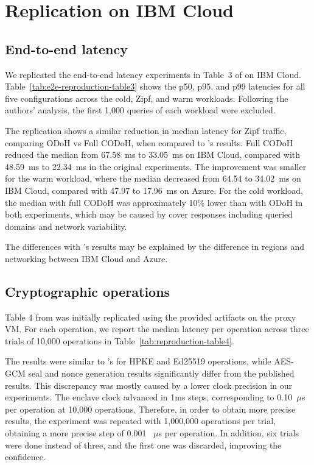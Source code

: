 \documentclass[a4paper]{article}
\begin{document}
\section{Replication on IBM Cloud}
\label{sec:results}

\subsection{End-to-end latency}
\label{sec:e2elat}
 
We replicated the end-to-end latency experiments in Table~3 of \citet{niroula2026codoh} on IBM Cloud. Table~\ref{tab:e2e-reproduction-table3} shows the p50, p95, and p99 latencies for all five configurations across the cold, Zipf, and warm workloads. Following the authors' analysis, the first 1,000 queries of each workload were excluded.



The replication shows a similar reduction in median latency for Zipf traffic, comparing ODoH vs Full CODoH, when compared to \citet{niroula2026codoh}'s results. Full CODoH reduced the median from 67.58~ms to 33.05~ms on IBM Cloud, compared with 48.59~ms to 22.34~ms in the original experiments. The improvement was smaller for the warm workload, where the median decreased from 64.54 to 34.02~ms on IBM Cloud, compared with 47.97 to 17.96~ms on Azure. For the cold workload, the median with full CODoH was approximately 10\% lower than with ODoH in both experiments, which may be caused by cover responses including queried domains and network variability.

The differences with \citet{niroula2026codoh}'s results may be explained by the difference in regions and networking between IBM Cloud and Azure.


\subsection{Cryptographic operations}
\label{sec:cryptoops}

Table 4 from \citet{niroula2026codoh} was initially replicated using the provided artifacts on the proxy VM. For each operation, we report the median latency per operation across three trials of 10,000 operations in Table~\ref{tab:reproduction-table4}.

The results were similar to \citet{niroula2026codoh}'s for HPKE and Ed25519 operations, while AES-GCM seal and nonce generation results significantly differ from the published results. This discrepancy was mostly caused by a lower clock precision in our experiments. The enclave clock advanced in 1ms steps, corresponding to 0.10~${}\mu$s per operation at 10,000 operations. Therefore, in order to obtain more precise results, the experiment was repeated with 1,000,000 operations per trial, obtaining a more precise step of 0.001 ~${}\mu$s per operation. In addition, six trials were done instead of three, and the first one was discarded, improving the confidence.
\end{document}
